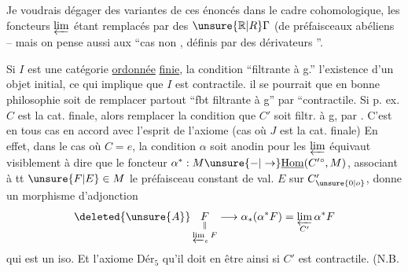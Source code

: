 Je voudrais dégager des variantes de ces énoncés dans le cadre cohomologique, les foncteurs $\varprojlim$ étant remplacés par des $\unsure{\mathbb R|R}\Gamma$ (de préfaisceaux abéliens  -- mais on pense aussi aux ``cas non , définis par des dérivateurs ''.

Si $I$ est une catégorie \uline{ordonnée} \uline{finie}, la condition ``filtrante à g.''   l'existence d'un objet initial, ce qui implique que $I$ est contractile.   il se pourrait que en bonne philosophie soit de remplacer partout ``fbt filtrante à g'' par ``contractile.  Si p. ex. $C$ est la cat. finale, alors remplacer la condition que $C'$ soit filtr. à g, par . C'est en tous cas en accord avec l'esprit de l'axiome  (cas où $J$ est la cat. finale) En effet, dans le cas où $C=e$, la condition  $\alpha$ soit anodin pour les $\varprojlim$ équivaut visiblement à dire que le foncteur $\alpha^*:M\unsure{-|\to}\underline{\mathrm{Hom}}(C'{}^\circ,M)$, associant à tt $\unsure{F|E}\in M$ le préfaisceau constant de val. $E$
sur $C'_{\unsure{0|o}}$,  donne un morphisme d'adjonction
\[
 \deleted{\unsure{A}}\,\underset{\varprojlim_e F}{\underset{\Vert}{F}}\longrightarrow\alpha_*(\alpha^* F)=\varprojlim_{C'}\alpha^*F
\]
 qui est un iso. Et l'axiome $\mathrm{Dér}_{5}$   qu'il doit en être ainsi si $C'$ est contractile. (N.B.
\diagram{\begin{tikzcd}[ampersand replacement=\&,row sep=tiny,column sep=tiny]
\&\deleted{\cdot}\arrow[d]\\\deleted{\cdot}\arrow[r]\&\deleted{\cdot}
\end{tikzcd}}

